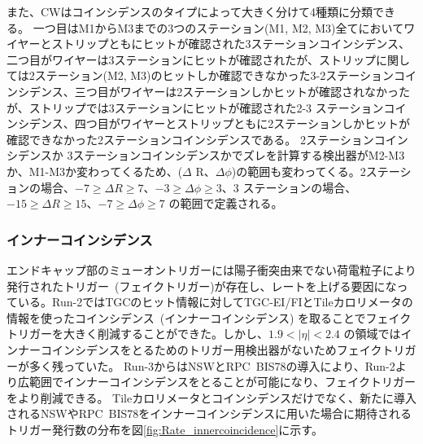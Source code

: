また、CWはコインシデンスのタイプによって大きく分けて4種類に分類できる。
一つ目はM1からM3までの3つのステーション(M1, M2, M3)全てにおいてワイヤーとストリップともにヒットが確認された3ステーションコインシデンス、二つ目がワイヤーは3ステーションにヒットが確認されたが、ストリップに関しては2ステーション(M2, M3)のヒットしか確認できなかった3-2ステーションコインシデンス、三つ目がワイヤーは2ステーションしかヒットが確認されなかったが、ストリップでは3ステーションにヒットが確認された2-3 ステーションコインシデンス、四つ目がワイヤーとストリップともに2ステーションしかヒットが確認できなかった2ステーションコインシデンスである。
2ステーションコインシデンスか 3ステーションコインシデンスかでズレを計算する検出器がM2-M3か、M1-M3か変わってくるため、($\Delta$ R、$\Delta \phi$)の範囲も変わってくる。2ステーションの場合、$−7 \geq \Delta R \geq 7$、$−3 \geq \Delta \phi \geq 3$、3 ステーションの場合、$−15 \geq \Delta R \geq 15$、$−7 \geq \Delta \phi \geq 7$ の範囲で定義される。




\subsubsection{インナーコインシデンス}
エンドキャップ部のミューオントリガーには陽子衝突由来でない荷電粒子により発行されたトリガー~(フェイクトリガー)が存在し、レートを上げる要因になっている。Run-2ではTGCのヒット情報に対してTGC-EI/FIとTileカロリメータの情報を使ったコインシデンス~(インナーコインシデンス) を取ることでフェイクトリガーを大きく削減することができた。しかし、$1.9 < |\eta| < 2.4$ の領域ではインナーコインシデンスをとるためのトリガー用検出器がないためフェイクトリガーが多く残っていた。
Run-3からはNSWとRPC~BIS78の導入により、Run-2より広範囲でインナーコインシデンスをとることが可能になり、フェイクトリガーをより削減できる。
Tileカロリメータとコインシデンスだけでなく、新たに導入されるNSWやRPC~BIS78をインナーコインシデンスに用いた場合に期待されるトリガー発行数の分布を図\ref{fig:Rate_innercoincidence}に示す。

